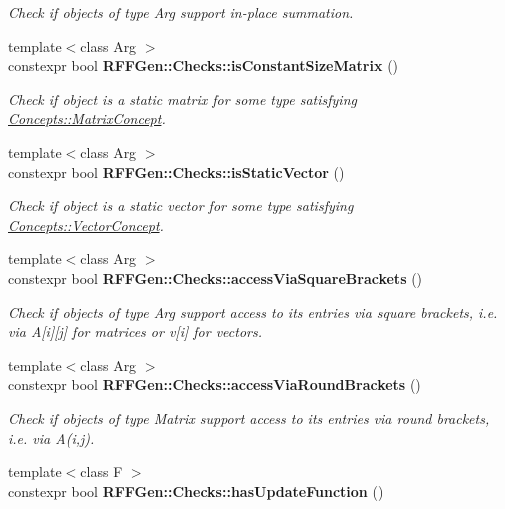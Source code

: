 \begin{DoxyCompactItemize}
\begin{DoxyCompactList}\small\item\em Check if objects of type Arg support in-\/place summation. \end{DoxyCompactList}\item 
{\footnotesize template$<$class Arg $>$ }\\constexpr bool {\bfseries R\-F\-F\-Gen\-::\-Checks\-::is\-Constant\-Size\-Matrix} ()
\begin{DoxyCompactList}\small\item\em Check if object is a static matrix for some type satisfying \hyperlink{structRFFGen_1_1Concepts_1_1MatrixConcept}{Concepts\-::\-Matrix\-Concept}. \end{DoxyCompactList}\item 
{\footnotesize template$<$class Arg $>$ }\\constexpr bool {\bfseries R\-F\-F\-Gen\-::\-Checks\-::is\-Static\-Vector} ()
\begin{DoxyCompactList}\small\item\em Check if object is a static vector for some type satisfying \hyperlink{structRFFGen_1_1Concepts_1_1VectorConcept}{Concepts\-::\-Vector\-Concept}. \end{DoxyCompactList}\item 
\hypertarget{namespaceRFFGen_1_1Checks_a4622021a6a620bf44875e0c0d19ed82b}{{\footnotesize template$<$class Arg $>$ }\\constexpr bool {\bfseries R\-F\-F\-Gen\-::\-Checks\-::access\-Via\-Square\-Brackets} ()}\label{namespaceRFFGen_1_1Checks_a4622021a6a620bf44875e0c0d19ed82b}

\begin{DoxyCompactList}\small\item\em Check if objects of type Arg support access to its entries via square brackets, i.\-e. via A\mbox{[}i\mbox{]}\mbox{[}j\mbox{]} for matrices or v\mbox{[}i\mbox{]} for vectors. \end{DoxyCompactList}\item 
\hypertarget{namespaceRFFGen_1_1Checks_a3d869a871a321c008e7a577d73cbd340}{{\footnotesize template$<$class Arg $>$ }\\constexpr bool {\bfseries R\-F\-F\-Gen\-::\-Checks\-::access\-Via\-Round\-Brackets} ()}\label{namespaceRFFGen_1_1Checks_a3d869a871a321c008e7a577d73cbd340}

\begin{DoxyCompactList}\small\item\em Check if objects of type Matrix support access to its entries via round brackets, i.\-e. via A(i,j). \end{DoxyCompactList}\item 
\hypertarget{namespaceRFFGen_1_1Checks_a0b72c238e9fcf247cdb31375fc681796}{{\footnotesize template$<$class F $>$ }\\constexpr bool {\bfseries R\-F\-F\-Gen\-::\-Checks\-::has\-Update\-Function} ()}\label{namespaceRFFGen_1_1Checks_a0b72c238e9fcf247cdb31375fc681796}


\end{DoxyCompactItemize}
